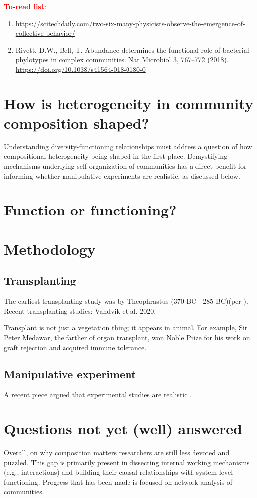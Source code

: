 \documentclass[letterpaper, 10pt]{article}
\begin{document}
\textcolor{red}{\textbf{To-read list}}:
\begin{enumerate}
\item \url{https://scitechdaily.com/two-six-many-physicists-observe-the-emergence-of-collective-behavior/}
\item Rivett, D.W., Bell, T. Abundance determines the functional role of bacterial phylotypes in complex communities. Nat Microbiol 3, 767–772 (2018). \url{https://doi.org/10.1038/s41564-018-0180-0}
\end{enumerate}


\section{How is heterogeneity in community composition shaped?}
Understanding diversity-functioning relationships must address a question of how compositional heterogeneity being shaped in the first place. Demystifying mechanisms underlying self-organization of communities has a direct benefit for informing whether manipulative experiments are realistic, as discussed below.


\section{Function or functioning?}
\citep{jax2005function}

\section{Methodology}
\subsection{Transplanting}
The earliest transplanting study was by Theophrastus (370 BC - 285 BC)(per \citet{woodward1987climate}). Recent transplanting studies: Vandvik et al. 2020\citep{vandvik2020biotic}.

Transplant is not just a vegetation thing; it appears in animal. For example, Sir Peter Medawar, the farther of organ transplant, won Noble Prize for his work on graft rejection and acquired immune tolerance.

\subsection{Manipulative experiment}
A recent piece argued that experimental studies are realistic \citep{jochum2020results}.

\section{Questions not yet (well) answered}
Overall, on why composition matters researchers are still less devoted and puzzled. This gap is primarily present in dissecting internal working mechanisms (e.g., interactions) and building their causal relationships with system-level functioning. Progress that has been made is focused on network analysis of communities.
\end{document}
